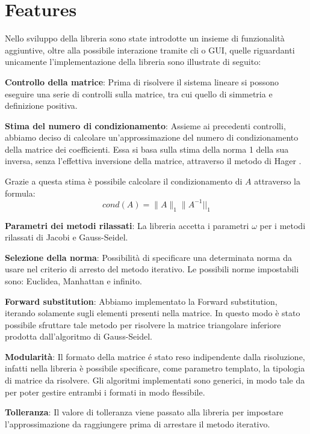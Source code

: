 \section{Features}

Nello sviluppo della libreria sono state introdotte un insieme di funzionalità aggiuntive, oltre alla possibile interazione tramite cli o GUI, quelle riguardanti unicamente l'implementazione della libreria sono illustrate di seguito:

\begin{itemize}
	\begin{item}
		\textbf{Controllo della matrice}: Prima di risolvere il sistema lineare si possono eseguire una serie di controlli sulla matrice, tra cui quello di simmetria e definizione positiva.
	\end{item}
	\begin{item}
		\textbf{Stima del numero di condizionamento}: Assieme ai precedenti controlli, abbiamo deciso di calcolare un'approssimazione del numero di condizionamento della matrice dei coefficienti. Essa si basa sulla stima della norma 1 della sua inversa, senza l'effettiva inversione della matrice, attraverso il metodo di Hager \cite{hager, hager2}.
		
		Grazie a questa stima è possibile calcolare il condizionamento di $A$ attraverso la formula:
		$$ cond(A) = \|A\|_1  \|A^{-1}||_1$$
			
			\end{item}
	\begin{item}
		\textbf{Parametri dei metodi rilassati}: La libreria accetta i parametri $\omega$ per i metodi rilassati di Jacobi e Gauss-Seidel.
	\end{item}
	\begin{item}
		\textbf{Selezione della norma}: Possibilità di specificare una determinata norma da usare nel criterio di arresto del metodo iterativo. Le possibili norme impostabili sono: Euclidea, Manhattan e infinito.
	\end{item}
	\begin{item}
		\textbf{Forward substitution}: Abbiamo implementato la Forward substitution, iterando solamente sugli elementi presenti nella matrice. In questo modo è stato possibile sfruttare tale metodo per risolvere la matrice triangolare inferiore prodotta dall'algoritmo di Gauss-Seidel.
	\end{item}
	\begin{item}
		\textbf{Modularità}: Il formato della matrice é stato reso indipendente dalla risoluzione, infatti nella libreria è possibile specificare, come parametro templato, la tipologia di matrice da risolvere. Gli algoritmi implementati sono generici, in modo tale da per poter gestire entrambi i formati in modo flessibile.
	\end{item}
	\begin{item}
		\textbf{Tolleranza}: Il valore di tolleranza viene passato alla libreria per impostare l'approssimazione da raggiungere prima di arrestare il metodo iterativo.
	\end{item}


\end{itemize}
